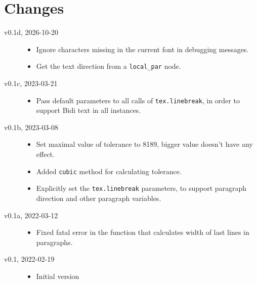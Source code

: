 \documentclass{l3doc}
\begin{document}
\section{Changes}

\begin{description}
  \item[v0.1d, 2026-10-20]\hfill
    \begin{itemize}
      \item Ignore characters missing in the current font in debugging messages.
      \item Get the text direction from a \verb|local_par| node.
    \end{itemize}
  \item[v0.1c, 2023-03-21]\hfill
    \begin{itemize}
      \item Pass default parameters to all calls of \verb|tex.linebreak|, in order to support Bidi text in all instances.
    \end{itemize}
  \item[v0.1b, 2023-03-08]\hfill
    \begin{itemize}
      \item Set maximal value of tolerance to 8189, bigger value doesn't have any effect.
      \item Added \verb|cubic| method for calculating tolerance.
      \item Explicitly set the \verb|tex.linebreak| parameters, to support paragraph direction and other paragraph variables.
    \end{itemize}
  \item[v0.1a, 2022-03-12]\hfill

    \begin{itemize}
      \item Fixed fatal error in the function that calculates width of last lines in paragraphs.
    \end{itemize}

  \item[v0.1, 2022-02-19]\hfill

    \begin{itemize}
      \item Initial version
    \end{itemize}
\end{description}
\end{document}
